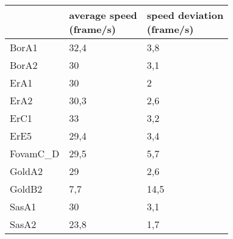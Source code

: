     \begin{tabular}{|l|p{30mm}|p{30mm}|}
\cmidrule{2-3}    \multicolumn{1}{r|}{} & \multicolumn{1}{p{30mm}|}{average  speed \newline (\si{frame/s})} & \multicolumn{1}{p{30mm}|}{speed deviation \newline  (\si{frame/s})} \\
\midrule \midrule
    BorA1 & 32,4  & 3,8 \\
    \midrule
    BorA2 & 30    & 3,1 \\
    \midrule
    ErA1  & 30    & 2 \\
    \midrule
    ErA2  & 30,3  & 2,6 \\
    \midrule
    ErC1  & 33    & 3,2 \\
    \midrule
    ErE5  & 29,4  & 3,4 \\
    \midrule
    FovamC\_D & 29,5  & 5,7 \\
    \midrule
    GoldA2 & 29    & 2,6 \\
    \midrule
    GoldB2 & 7,7   & 14,5 \\
    \midrule
    SasA1 & 30    & 3,1 \\
    \midrule
    SasA2 & 23,8  & 1,7 \\
    \bottomrule
    \end{tabular}%
